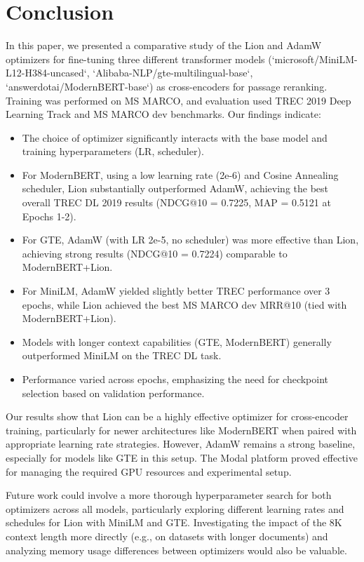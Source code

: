 \documentclass[conference]{IEEEtran}
\begin{document}
\section{Conclusion}
\label{sec:conclusion}
In this paper, we presented a comparative study of the Lion and AdamW optimizers for fine-tuning three different transformer models (`microsoft/MiniLM-L12-H384-uncased`, `Alibaba-NLP/gte-multilingual-base`, `answerdotai/ModernBERT-base`) as cross-encoders for passage reranking. Training was performed on MS MARCO, and evaluation used TREC 2019 Deep Learning Track and MS MARCO dev benchmarks. Our findings indicate:
\begin{itemize}
    \item The choice of optimizer significantly interacts with the base model and training hyperparameters (LR, scheduler).
    \item For ModernBERT, using a low learning rate (2e-6) and Cosine Annealing scheduler, Lion substantially outperformed AdamW, achieving the best overall TREC DL 2019 results (NDCG@10 = 0.7225, MAP = 0.5121 at Epochs 1-2).
    \item For GTE, AdamW (with LR 2e-5, no scheduler) was more effective than Lion, achieving strong results (NDCG@10 = 0.7224) comparable to ModernBERT+Lion.
    \item For MiniLM, AdamW yielded slightly better TREC performance over 3 epochs, while Lion achieved the best MS MARCO dev MRR@10 (tied with ModernBERT+Lion).
    \item Models with longer context capabilities (GTE, ModernBERT) generally outperformed MiniLM on the TREC DL task.
    \item Performance varied across epochs, emphasizing the need for checkpoint selection based on validation performance.
\end{itemize}
Our results show that Lion can be a highly effective optimizer for cross-encoder training, particularly for newer architectures like ModernBERT when paired with appropriate learning rate strategies. However, AdamW remains a strong baseline, especially for models like GTE in this setup. The Modal platform proved effective for managing the required GPU resources and experimental setup.

Future work could involve a more thorough hyperparameter search for both optimizers across all models, particularly exploring different learning rates and schedules for Lion with MiniLM and GTE. Investigating the impact of the 8K context length more directly (e.g., on datasets with longer documents) and analyzing memory usage differences between optimizers would also be valuable.
\end{document}
